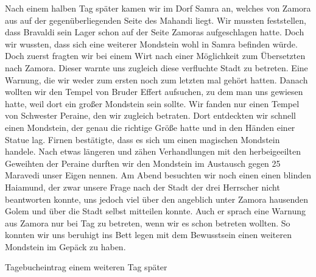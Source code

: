 Nach einem halben Tag später kamen wir im Dorf Samra an, welches von Zamora aus auf der gegenüberliegenden Seite des Mahandi liegt. Wir mussten feststellen, dass Bravaldi sein Lager schon auf der Seite Zamoras aufgeschlagen hatte. Doch wir wussten, dass sich eine weiterer Mondstein wohl in Samra befinden würde. Doch zuerst fragten wir bei einem Wirt nach einer Möglichkeit zum Übersetzten nach Zamora. Dieser warnte uns zugleich diese verfluchte Stadt zu betreten. Eine Warnung, die wir weder zum ersten noch zum letzten mal gehört hatten. Danach wollten wir den Tempel von Bruder Effert aufsuchen, zu dem man uns gewiesen hatte, weil dort ein großer Mondstein sein sollte. Wir fanden nur einen Tempel von Schwester Peraine, den wir zugleich betraten. Dort entdeckten wir schnell einen Mondstein, der genau die richtige Größe hatte und in den Händen einer Statue lag. Firnen bestätigte, dass es sich um einen magischen Mondstein handele. Nach etwas längeren und zähen Verhandlungen mit den herbeigeeilten Geweihten der Peraine durften wir den Mondstein im Austausch gegen 25 Maravedi unser Eigen nennen. Am Abend besuchten wir noch einen einen blinden Haiamund, der zwar unsere Frage nach der Stadt der drei Herrscher nicht beantworten konnte, uns jedoch viel über den angeblich unter Zamora hausenden Golem und über die Stadt selbst mitteilen konnte. Auch er sprach eine Warnung aus Zamora nur bei Tag zu betreten, wenn wir es schon betreten wollten. So konnten wir uns beruhigt ins Bett legen mit dem Bewusstsein einen weiteren Mondstein im Gepäck zu haben.

Tagebucheintrag einem weiteren Tag später

